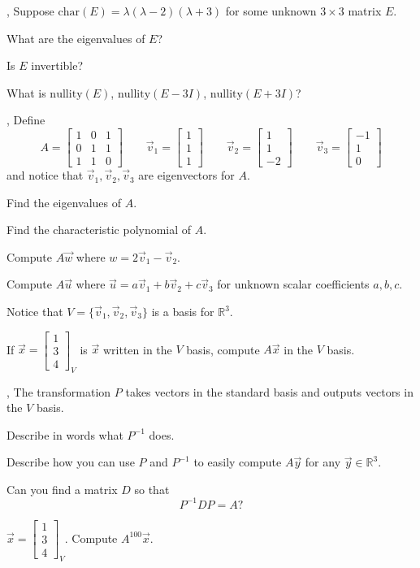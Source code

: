 \documentclass{article}
\newcommand{\R}{\mathbb{R}}
\newcommand{\nnul}{\mathrm{nullity}}
\newcommand{\mat}[1]{\begin{bmatrix}#1\end{bmatrix}}
\newcommand{\chr}{\mathrm{char}}
\begin{document}
	\sep
	Suppose $\chr(E)=\lambda(\lambda -2)(\lambda +3)$ for some unknown $3\times 3$
	matrix $E$.
	\begin{Enum}
		\item What are the eigenvalues of $E$?
		\item Is $E$ invertible?
		\item What is $\nnul(E)$, $\nnul(E-3I)$, $\nnul(E+3I)$?
	\end{Enum}

	\sep
	Define
	\[
		A=\mat{1&0&1\\0&1&1\\1&1&0}\qquad
		\vec v_1=\mat{1\\1\\1}\qquad
		\vec v_2=\mat{1\\1\\-2}\qquad
		\vec v_3=\mat{-1\\1\\0}
	\]
	and notice that $\vec v_1,\vec v_2,\vec v_3$ are eigenvectors for $A$.
	\begin{Enum}
		\item Find the eigenvalues of $A$.
		\item Find the characteristic polynomial of $A$.
		\item Compute $A\vec w$ where $w=2\vec v_1-\vec v_2$.
		\item Compute $A\vec u$ where $\vec u=a\vec v_1+b\vec v_2+c\vec v_3$ for
			unknown scalar coefficients $a,b,c$.
	\end{Enum}
	Notice that $V=\{\vec v_1,\vec v_2,\vec v_3\}$ is a basis for $\R^3$.
	\begin{Enum}[resume]
	\item If $\vec x=\mat{1\\3\\4}_V$ is $\vec x$ written in the $V$ basis,
		compute $A\vec x$ in the $V$ basis.
	\end{Enum}
	
	\sep
	The transformation $P$ takes vectors in the standard basis and outputs
	vectors in the $V$ basis.  
	\begin{Enum}
		\item Describe in words what $P^{-1}$ does.
		\item Describe how you can use $P$ and $P^{-1}$ to easily compute
			$A\vec y$ for any $\vec y\in \R^3$.
		\item Can you find a matrix $D$ so that
			\[
				P^{-1}DP=A?
			\]
		\item $\vec x=\mat{1\\3\\4}_V$.  Compute $A^{100}\vec x$.
	\end{Enum}
\end{document}
